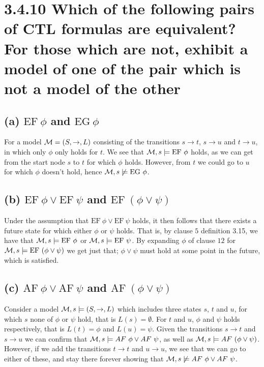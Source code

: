 \documentclass[11pt,a4paper]{article}
\let\imp\to
\begin{document}
\section*{3.4.10 \mdseries Which of the following pairs of CTL formulas are
equivalent? For those which are not, exhibit a model of one of the pair which
is not a model of the other}

\subsection*{(a) \mdseries $\text{EF}{\ }\phi$ and $\text{EG}{\ }\phi$}
For a model ${\cal M} = (S,\imp,L)$ consisting of the transitions $s \imp t$,
$s \imp u$ and $t \imp u$, in which only $\phi$ only holds for $t$. We see
that ${\cal M}, s \models \text{EF}{\ }\phi$ holds, as we can get from the
start node $s$ to $t$ for which $\phi$ holds. However, from $t$ we could go
to $u$ for which $\phi$ doesn't hold, hence
${\cal M}, s \not\models \text{EG}{\ }\phi$.

\subsection*{(b) \mdseries $\text{EF}{\ }\phi \lor \text{EF}{\ }\psi$ and
$\text{EF}{\ }(\phi \lor \psi)$}
Under the assumption that $\text{EF}{\ }\phi \lor \text{EF}{\ }\psi$ holds, it
then follows that there exists a future state for which either $\phi$ or
$\psi$ holds. That is, by clause $5$ definition 3.15, we have that
${\cal M}, s \models \text{EF}{\ }\phi$ or
${\cal M}, s \models \text{EF}{\ }\psi$. By expanding $\phi$ of clause $12$
for ${\cal M}, s \models \text{EF}{\ }(\phi \lor \psi)$ we get just that;
$\phi \lor \psi$ must hold at some point in the future, which is satisfied.

\subsection*{(c) \mdseries $\text{AF}{\ }\phi \lor \text{AF}{\ }\psi$ and
$\text{AF}{\ }(\phi \lor \psi)$}
Consider a model ${\cal M}, s \models (S,\imp,L)$ which includes three states
$s$, $t$ and $u$, for which $s$ none of $\phi$ or $\psi$ hold, that is $L(s)
= \emptyset$. For $t$ and $u$, $\phi$ and $\psi$ holds respectively, that is
$L(t) = \phi$ and $L(u) = \psi$. Given the transitions $s \imp t$ and $s \imp
u$ we can confirm that ${\cal M}, s \models AF{\ }\phi \lor AF{\ }\psi$, as
well as ${\cal M}, s \models AF{\ }(\phi \lor \psi)$. However, if we add the
transitions $t \imp t$ and $u \imp u$, we see that we can go to either of
these, and stay there forever showing that
${\cal M}, s \not\models AF{\ }\phi \lor AF{\ }\psi$.
\end{document}
